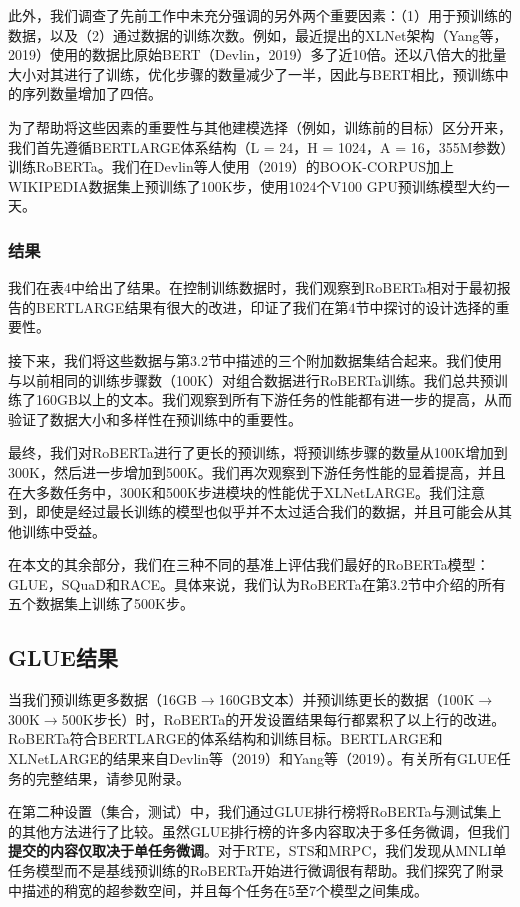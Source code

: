 \documentclass[lang=cn,11pt,a4paper,twocolumn]{elegantpaper}
\begin{document}
此外，我们调查了先前工作中未充分强调的另外两个重要因素：（1）用于预训练的数据，以及（2）通过数据的训练次数。例如，最近提出的XLNet架构（Yang等，2019）使用的数据比原始BERT（Devlin，2019）多了近10倍。还以八倍大的批量大小对其进行了训练，优化步骤的数量减少了一半，因此与BERT相比，预训练中的序列数量增加了四倍。

为了帮助将这些因素的重要性与其他建模选择（例如，训练前的目标）区分开来，我们首先遵循BERTLARGE体系结构（L = 24，H = 1024，A = 16，355M参数）训练RoBERTa。我们在Devlin等人使用（2019）的BOOK-CORPUS加上WIKIPEDIA数据集上预训练了100K步，使用1024个V100 GPU预训练模型大约一天。

\subsubsection*{结果}

我们在表4中给出了结果。在控制训练数据时，我们观察到RoBERTa相对于最初报告的BERTLARGE结果有很大的改进，印证了我们在第4节中探讨的设计选择的重要性。

接下来，我们将这些数据与第3.2节中描述的三个附加数据集结合起来。我们使用与以前相同的训练步骤数（100K）对组合数据进行RoBERTa训练。我们总共预训练了160GB以上的文本。我们观察到所有下游任务的性能都有进一步的提高，从而验证了数据大小和多样性在预训练中的重要性。

最终，我们对RoBERTa进行了更长的预训练，将预训练步骤的数量从100K增加到300K，然后进一步增加到500K。我们再次观察到下游任务性能的显着提高，并且在大多数任务中，300K和500K步进模块的性能优于XLNetLARGE。我们注意到，即使是经过最长训练的模型也似乎并不太过适合我们的数据，并且可能会从其他训练中受益。

在本文的其余部分，我们在三种不同的基准上评估我们最好的RoBERTa模型：GLUE，SQuaD和RACE。具体来说，我们认为RoBERTa在第3.2节中介绍的所有五个数据集上训练了500K步。

\subsection{GLUE结果}
当我们预训练更多数据（16GB$\rightarrow$160GB文本）并预训练更长的数据（100K$\rightarrow$300K$\rightarrow$500K步长）时，RoBERTa的开发设置结果每行都累积了以上行的改进。RoBERTa符合BERTLARGE的体系结构和训练目标。BERTLARGE和XLNetLARGE的结果来自Devlin等（2019）和Yang等（2019）。有关所有GLUE任务的完整结果，请参见附录。

在第二种设置（集合，测试）中，我们通过GLUE排行榜将RoBERTa与测试集上的其他方法进行了比较。虽然GLUE排行榜的许多内容取决于多任务微调，但我们\textbf{提交的内容仅取决于单任务微调}。对于RTE，STS和MRPC，我们发现从MNLI单任务模型而不是基线预训练的RoBERTa开始进行微调很有帮助。我们探究了附录中描述的稍宽的超参数空间，并且每个任务在5至7个模型之间集成。
\end{document}
